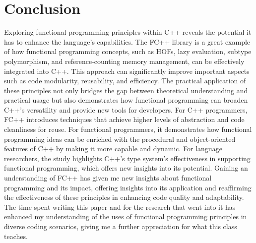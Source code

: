\documentclass[12pt]{article}
\begin{document}
\section{Conclusion}
Exploring functional programming principles within C++ reveals the potential it has to enhance the language's capabilities. The FC++ library is a great example of how functional programming concepts, such as HOFs, lazy evaluation, subtype polymorphism, and reference-counting memory management, can be effectively integrated into C++. This approach can significantly improve important aspects such as code modularity, reusability, and efficiency. The practical application of these principles not only bridges the gap between theoretical understanding and practical usage but also demonstrates how functional programming can broaden C++'s versatility and provide new tools for developers. For C++ programmers, FC++ introduces techniques that achieve higher levels of abstraction and code cleanliness for reuse. For functional programmers, it demonstrates how functional programming ideas can be enriched with the procedural and object-oriented features of C++ by making it more capable and dynamic. For language researchers, the study highlights C++’s type system's effectiveness in supporting functional programming, which offers new insights into its potential. Gaining an understanding of FC++ has given me new insights about functional programming and its impact, offering insights into its application and reaffirming the effectiveness of these principles in enhancing code quality and adaptability. The time spent writing this paper and for the research that went into it has enhanced my understanding of the uses of functional programming principles in diverse coding scenarios, giving me a further appreciation for what this class teaches.
\end{document}
